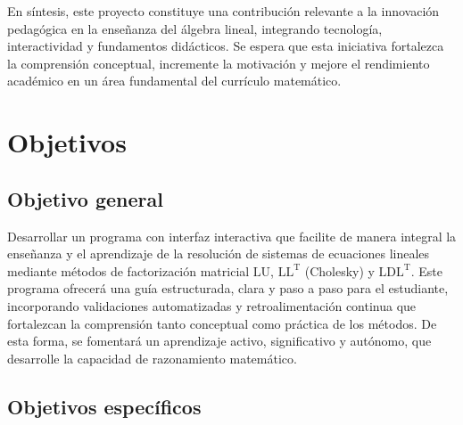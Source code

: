 \noindent En síntesis, este proyecto constituye una contribución relevante a la innovación pedagógica en la enseñanza del álgebra lineal, integrando tecnología, interactividad y fundamentos didácticos. Se espera que esta iniciativa fortalezca la comprensión conceptual, incremente la motivación y mejore el rendimiento académico en un área fundamental del currículo matemático.

\section{Objetivos}

\subsection{Objetivo general}

\noindent Desarrollar un programa con interfaz interactiva que facilite de manera integral la enseñanza y el aprendizaje de la resolución de sistemas de ecuaciones lineales mediante métodos de factorización matricial $\mathrm{LU}$, $\mathrm{LL^T}$ (Cholesky) y $\mathrm{LDL^T}$. Este programa ofrecerá una guía estructurada, clara y paso a paso para el estudiante, incorporando validaciones automatizadas y retroalimentación continua que fortalezcan la comprensión tanto conceptual como práctica de los métodos. De esta forma, se fomentará un aprendizaje activo, significativo y autónomo, que desarrolle la capacidad de razonamiento matemático.

\subsection{Objetivos específicos}

